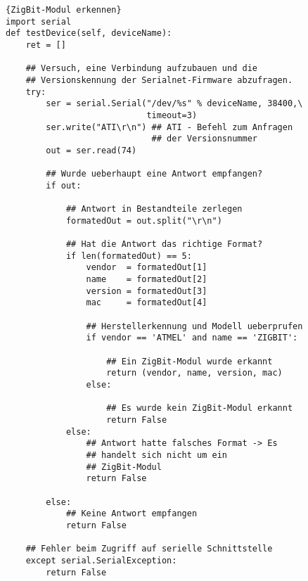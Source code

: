 \begin{lstlisting}{ZigBit-Modul erkennen}
import serial
def testDevice(self, deviceName):
    ret = []

    ## Versuch, eine Verbindung aufzubauen und die 
    ## Versionskennung der Serialnet-Firmware abzufragen. 
    try:
        ser = serial.Serial("/dev/%s" % deviceName, 38400,\
                            timeout=3)
        ser.write("ATI\r\n") ## ATI - Befehl zum Anfragen
                             ## der Versionsnummer
        out = ser.read(74)
        
        ## Wurde ueberhaupt eine Antwort empfangen? 
        if out:

            ## Antwort in Bestandteile zerlegen
            formatedOut = out.split("\r\n")

            ## Hat die Antwort das richtige Format?
            if len(formatedOut) == 5:
                vendor  = formatedOut[1]
                name    = formatedOut[2]
                version = formatedOut[3]
                mac     = formatedOut[4]

                ## Herstellerkennung und Modell ueberprufen
                if vendor == 'ATMEL' and name == 'ZIGBIT':

                    ## Ein ZigBit-Modul wurde erkannt
                    return (vendor, name, version, mac)
                else:

                    ## Es wurde kein ZigBit-Modul erkannt
                    return False
            else:
                ## Antwort hatte falsches Format -> Es 
                ## handelt sich nicht um ein 
                ## ZigBit-Modul
                return False

        else:
            ## Keine Antwort empfangen
            return False

    ## Fehler beim Zugriff auf serielle Schnittstelle
    except serial.SerialException:
        return False
\end{lstlisting}


